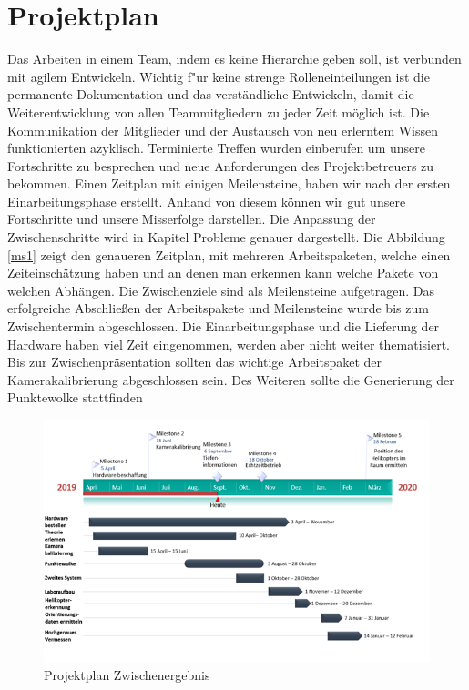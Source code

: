 \chapter{Projektplan}
\label{cha:projektplan}

Das Arbeiten in einem Team, indem es keine Hierarchie geben soll, ist verbunden mit agilem Entwickeln. Wichtig f"ur keine strenge Rolleneinteilungen ist die permanente Dokumentation und das verständliche Entwickeln, damit die Weiterentwicklung von allen Teammitgliedern zu jeder Zeit möglich ist. Die Kommunikation der Mitglieder und der Austausch von neu erlerntem Wissen funktionierten azyklisch. Terminierte Treffen wurden einberufen um unsere Fortschritte zu besprechen und neue Anforderungen des Projektbetreuers zu bekommen. Einen Zeitplan mit einigen Meilensteine, haben wir nach der ersten Einarbeitungsphase erstellt. Anhand von diesem können wir gut unsere Fortschritte und unsere Misserfolge darstellen. Die Anpassung der Zwischenschritte wird in Kapitel Probleme genauer dargestellt.\newline
Die Abbildung \ref{ms1} zeigt den genaueren Zeitplan, mit mehreren Arbeitspaketen, welche einen Zeiteinschätzung haben und an denen man erkennen kann welche Pakete von welchen Abhängen. Die Zwischenziele sind als Meilensteine aufgetragen. Das erfolgreiche Abschließen der Arbeitspakete und Meilensteine wurde bis zum Zwischentermin abgeschlossen. Die Einarbeitungsphase und die Lieferung der Hardware haben viel Zeit eingenommen, werden aber nicht weiter thematisiert. Bis zur Zwischenpräsentation sollten das wichtige Arbeitspaket der Kamerakalibrierung abgeschlossen sein. Des Weiteren sollte die Generierung der Punktewolke stattfinden

\begin{figure}[H]
	\includegraphics[scale=1.4]{bilder/ms1}
	\caption[Projektplan Zwischenergebnis]{Projektplan Zwischenergebnis}
	\label{fig:ms1}
\end{figure}

